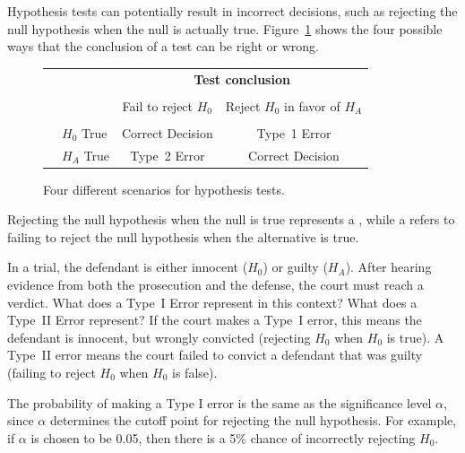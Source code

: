 Hypothesis tests can potentially result in incorrect decisions, such as rejecting the null hypothesis when the null is actually true. Figure~\ref{fourHTScenarios} shows the four possible ways that the conclusion of a test can be right or wrong.

\begin{figure}[ht]
	\centering
	\begin{tabular}{l l c c}
		& & \multicolumn{2}{c}{\textbf{Test conclusion}} \\
		\cline{3-4}
		\vspace{-3.7mm} \\
		& & Fail to reject $H_0$ &  Reject $H_0$ in favor of $H_A$ \\
		\cline{2-4}
		\vspace{-3.7mm} \\
		& $H_0$ True & Correct Decision &  Type~1 Error \\
		\raisebox{1.5ex}{\textbf{Reality}} & $H_A$ True & Type~2 Error & Correct Decision\\
		\cline{2-4}
	\end{tabular}
	\caption{Four different scenarios for hypothesis tests.}
	\label{fourHTScenarios}
\end{figure}

Rejecting the null hypothesis when the null is true represents a , while a  refers to failing to reject the null hypothesis when the alternative is true. 

\begin{examplewrap}
\begin{nexample}{In a trial, the defendant is either innocent ($H_0$) or guilty ($H_A$). After hearing evidence from both the prosecution and the defense, the court must reach a verdict. What does a Type~I Error represent in this context? What does a Type~II Error represent?}\label{whatAreTheErrorTypesInUSCourts}%
If the court makes a Type~I error, this means the defendant is innocent, but wrongly convicted (rejecting $H_0$ when $H_0$ is true). A Type~II error means the court failed to convict a defendant that was guilty (failing to reject $H_0$ when $H_0$ is false).
\end{nexample}
\end{examplewrap}

The probability of making a Type I error is the same as the significance level $\alpha$, since $\alpha$ determines the cutoff point for rejecting the null hypothesis. For example, if $\alpha$ is chosen to be 0.05, then there is a 5\% chance of incorrectly rejecting $H_0$. 

